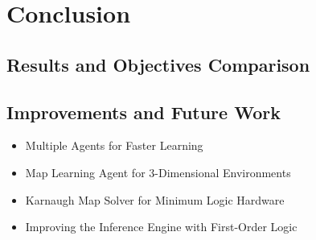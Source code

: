 






\chapter{Conclusion} 
\label{Conclusion}
\section{Results and Objectives Comparison}
\section{Improvements and Future Work}

\begin{itemize}
	\item Multiple Agents for Faster Learning
	\item Map Learning Agent for 3-Dimensional Environments
	\item Karnaugh Map Solver for Minimum Logic Hardware
	\item Improving the Inference Engine with First-Order Logic
\end{itemize}
